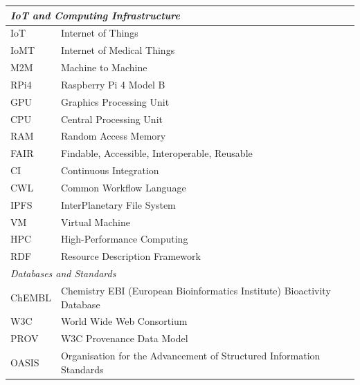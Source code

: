 \documentclass[conference]{IEEEtran}
\begin{document}
\begin{table}[!htbp]
{\begin{tabular}{p{2.2cm} p{6.2cm}}
\midrule
\multicolumn{2}{l}{\textit{IoT and Computing Infrastructure}} \\
\midrule
IoT        & Internet of Things \\
IoMT       & Internet of Medical Things \\
M2M        & Machine to Machine \\
RPi4       & Raspberry Pi 4 Model B \\
GPU        & Graphics Processing Unit \\
CPU        & Central Processing Unit \\
RAM        & Random Access Memory \\
FAIR       & Findable, Accessible, Interoperable,
             Reusable \\
CI         & Continuous Integration \\
CWL        & Common Workflow Language \\
IPFS       & InterPlanetary File System \\
VM         & Virtual Machine \\
HPC        & High-Performance Computing \\
RDF        & Resource Description Framework \\

\midrule
\multicolumn{2}{l}{\textit{Databases and Standards}} \\
\midrule
ChEMBL     & Chemistry EBI (European Bioinformatics
             Institute) Bioactivity Database \\
W3C        & World Wide Web Consortium \\
PROV       & W3C Provenance Data Model \\
OASIS      & Organisation for the Advancement of
             Structured Information Standards \\

\bottomrule
\end{tabular}}
\end{table}
\end{document}
